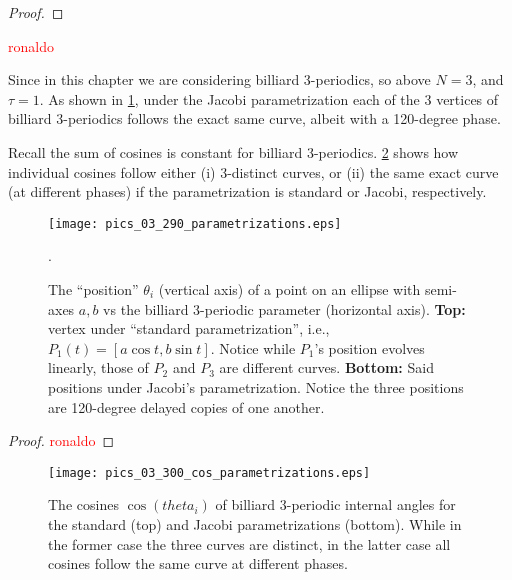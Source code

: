 \begin{proof}
\end{proof}
 

\textcolor{red}{ronaldo}
 

Since in this chapter we are considering billiard 3-periodics, so above $N=3$, and $\tau=1$. As shown in \cref{fig:03-jacobi-param}, under the Jacobi parametrization each of the 3 vertices of billiard 3-periodics follows the exact same curve, albeit with a 120-degree phase.



Recall the sum of cosines is constant for billiard 3-periodics. \cref{fig:03-jacobi-cos-param} shows how individual cosines follow either (i) 3-distinct curves, or (ii) the same exact curve (at different phases) if the parametrization is standard or Jacobi, respectively.

\begin{figure}
    \centering
    \texttt{[image: pics\_03\_290\_parametrizations.eps]}
    \caption{The ``position'' $\theta_i$ (vertical axis) of a point on an ellipse with semi-axes $a,b$ vs the billiard 3-periodic parameter (horizontal axis). \textbf{Top:} vertex  under ``standard parametrization'', i.e., $P_1(t)=[a\cos{t},b\sin{t}]$. Notice while $P_1$'s position evolves linearly, those of $P_2$ and $P_3$ are different curves. \textbf{Bottom:} Said positions under Jacobi's parametrization. Notice the three positions are 120-degree delayed copies of one another.}. 
    \label{fig:03-jacobi-param}
\end{figure}

\begin{proof}
\textcolor{red}{ronaldo}
\end{proof}
\begin{figure}
    \centering
    \texttt{[image: pics\_03\_300\_cos\_parametrizations.eps]}
    \caption{The cosines $\cos(theta_i)$ of billiard 3-periodic internal angles for the standard (top) and Jacobi parametrizations (bottom). While in the former case the three curves are distinct, in the latter case all cosines follow the same curve at different phases.}
    \label{fig:03-jacobi-cos-param}
\end{figure}
